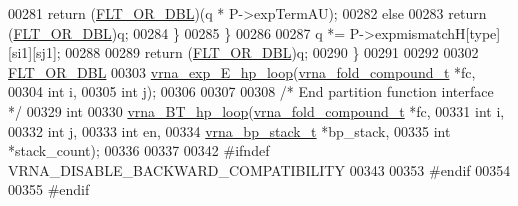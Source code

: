 \begin{DoxyCode}
00281         \textcolor{keywordflow}{return} (\hyperlink{group__data__structures_ga31125aeace516926bf7f251f759b6126}{FLT\_OR\_DBL})(q * P->expTermAU);
00282       \textcolor{keywordflow}{else}
00283         \textcolor{keywordflow}{return} (\hyperlink{group__data__structures_ga31125aeace516926bf7f251f759b6126}{FLT\_OR\_DBL})q;
00284     \}
00285   \}
00286 
00287   q *= P->expmismatchH[type][si1][sj1];
00288 
00289   \textcolor{keywordflow}{return} (\hyperlink{group__data__structures_ga31125aeace516926bf7f251f759b6126}{FLT\_OR\_DBL})q;
00290 \}
00291 
00292 
00302 \hyperlink{group__data__structures_ga31125aeace516926bf7f251f759b6126}{FLT\_OR\_DBL}
00303 \hyperlink{group__eval__loops__hp_gad62fe037be0a3fc6914676e5cb85be5e}{vrna\_exp\_E\_hp\_loop}(\hyperlink{group__fold__compound_structvrna__fc__s}{vrna\_fold\_compound\_t} *fc,
00304                    \textcolor{keywordtype}{int}                  i,
00305                    \textcolor{keywordtype}{int}                  j);
00306 
00307 
00308 \textcolor{comment}{/* End partition function interface */}
00329 \textcolor{keywordtype}{int}
00330 \hyperlink{group__mfe__backtracking_gae20d5805ddedc9b81d24735b11b6a9bf}{vrna\_BT\_hp\_loop}(\hyperlink{group__fold__compound_structvrna__fc__s}{vrna\_fold\_compound\_t}  *fc,
00331                 \textcolor{keywordtype}{int}                   i,
00332                 \textcolor{keywordtype}{int}                   j,
00333                 \textcolor{keywordtype}{int}                   en,
00334                 \hyperlink{group__data__structures_structvrna__bp__stack__s}{vrna\_bp\_stack\_t}       *bp\_stack,
00335                 \textcolor{keywordtype}{int}                   *stack\_count);
00336 
00337 
00342 \textcolor{preprocessor}{#ifndef VRNA\_DISABLE\_BACKWARD\_COMPATIBILITY}
00343 
00353 \textcolor{preprocessor}{#endif}
00354 
00355 \textcolor{preprocessor}{#endif}
\end{DoxyCode}

